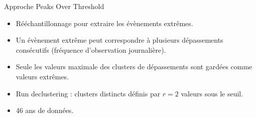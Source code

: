 \documentclass[aspectratio=169]{beamer}
\begin{document}
\begin{frame}{Approche Peaks Over Threshold}
\begin{itemize}
	\setlength{\itemsep}{17pt}
	\item Rééchantillonnage pour extraire les évènements extrêmes.
	\item Un évènement extrême peut correspondre à plusieurs dépassements consécutifs (fréquence d'observation journalière).
	\item Seule les valeurs maximale des clusters de dépassements sont gardées comme valeurs extrêmes.
	\item Run declustering : clusters distincts définis par $r=2$ valeurs sous le seuil.
	\item 46 ans de données.
\end{itemize}
\end{frame}
\end{document}
